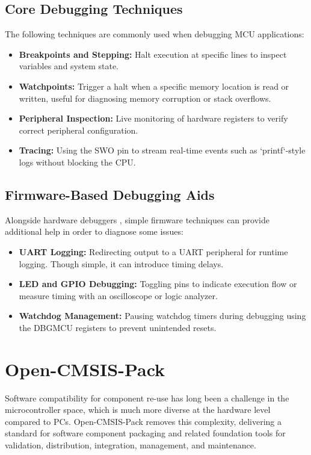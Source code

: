 \subsection{Core Debugging Techniques}
The following techniques are commonly used when debugging MCU applications:
\begin{itemize}
	\item \textbf{Breakpoints and Stepping:} Halt execution at specific lines to inspect variables and system state.
	\item \textbf{Watchpoints:} Trigger a halt when a specific memory location is read or written, useful for diagnosing memory corruption or stack overflows.
	\item \textbf{Peripheral Inspection:} Live monitoring of hardware registers to verify correct peripheral configuration.
	\item \textbf{Tracing:} Using the SWO pin to stream real-time events such as `printf`-style logs without blocking the CPU.
\end{itemize}

\subsection{Firmware-Based Debugging Aids}
Alongside hardware debuggers , simple firmware techniques can provide additional help in order to diagnose some issues:
\begin{itemize}
	\item \textbf{UART Logging:} Redirecting output to a UART peripheral for runtime logging. Though simple, it can introduce timing delays.
	\item \textbf{LED and GPIO Debugging:} Toggling pins to indicate execution flow or measure timing with an oscilloscope or logic analyzer.
	\item \textbf{Watchdog Management:} Pausing watchdog timers during debugging using the DBGMCU registers to prevent unintended resets.
\end{itemize}

\section{Open-CMSIS-Pack}
Software compatibility for component re-use has long been a challenge in the microcontroller space, which is much more diverse at the hardware level compared to PCs. Open-CMSIS-Pack removes this complexity, delivering a standard for software component packaging and related foundation tools for validation, distribution, integration, management, and maintenance.
